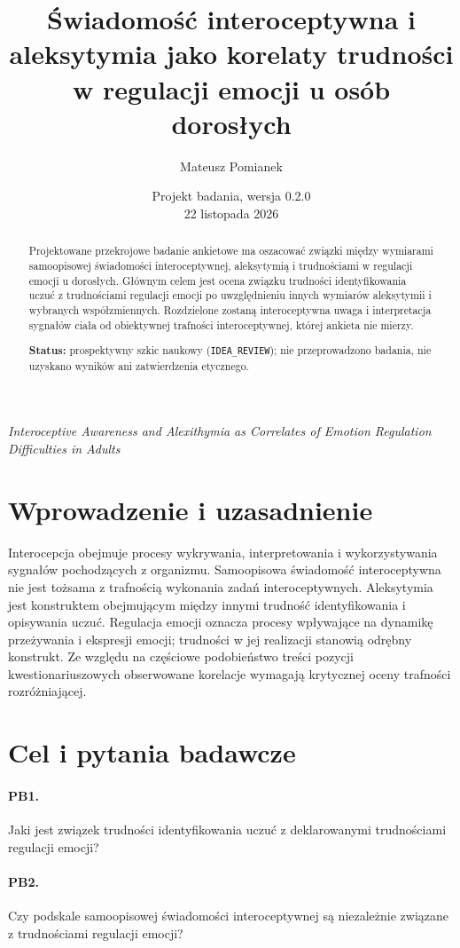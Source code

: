 \documentclass[11pt,a4paper]{article}
\title{Świadomość interoceptywna i aleksytymia jako korelaty trudności w regulacji emocji u osób dorosłych}
\author{Mateusz Pomianek}
\date{Projekt badania, wersja 0.2.0 \\ 22 listopada 2026}
\begin{document}
\maketitle
\begin{center}
\textit{Interoceptive Awareness and Alexithymia as Correlates of Emotion Regulation Difficulties in Adults}
\end{center}
\begin{abstract}
Projektowane przekrojowe badanie ankietowe ma oszacować związki między wymiarami samoopisowej świadomości interoceptywnej, aleksytymią i trudnościami w regulacji emocji u dorosłych. Głównym celem jest ocena związku trudności identyfikowania uczuć z trudnościami regulacji emocji po uwzględnieniu innych wymiarów aleksytymii i wybranych współzmiennych. Rozdzielone zostaną interoceptywna uwaga i interpretacja sygnałów ciała od obiektywnej trafności interoceptywnej, której ankieta nie mierzy.

\textbf{Status:} prospektywny szkic naukowy (\texttt{IDEA\_REVIEW}); nie przeprowadzono badania, nie uzyskano wyników ani zatwierdzenia etycznego.
\end{abstract}
\tableofcontents
\section{Wprowadzenie i uzasadnienie}
Interocepcja obejmuje procesy wykrywania, interpretowania i wykorzystywania sygnałów pochodzących z organizmu. Samoopisowa świadomość interoceptywna nie jest tożsama z trafnością wykonania zadań interoceptywnych. Aleksytymia jest konstruktem obejmującym między innymi trudność identyfikowania i opisywania uczuć. Regulacja emocji oznacza procesy wpływające na dynamikę przeżywania i ekspresji emocji; trudności w jej realizacji stanowią odrębny konstrukt. Ze względu na częściowe podobieństwo treści pozycji kwestionariuszowych obserwowane korelacje wymagają krytycznej oceny trafności rozróżniającej.
\section{Cel i pytania badawcze}
\paragraph{PB1.} Jaki jest związek trudności identyfikowania uczuć z deklarowanymi trudnościami regulacji emocji?

\paragraph{PB2.} Czy podskale samoopisowej świadomości interoceptywnej są niezależnie związane z trudnościami regulacji emocji?
\end{document}
